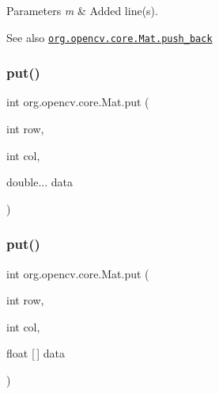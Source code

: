 \begin{DoxyParams}{Parameters}
{\em m} & Added line(s).\\
\hline
\end{DoxyParams}
\begin{DoxySeeAlso}{See also}
\href{http://docs.opencv.org/modules/core/doc/basic_structures.html#mat-push-back}{\tt org.\+opencv.\+core.\+Mat.\+push\+\_\+back} 
\end{DoxySeeAlso}
\mbox{\label{classorg_1_1opencv_1_1core_1_1_mat_a033211373530fc2ac99d291e405fa6f6}} 
\subsubsection{\texorpdfstring{put()}{put()}\hspace{0.1cm}{\footnotesize\ttfamily [1/5]}}
{\footnotesize\ttfamily int org.\+opencv.\+core.\+Mat.\+put (\begin{DoxyParamCaption}\item[{int}]{row,  }\item[{int}]{col,  }\item[{double...}]{data }\end{DoxyParamCaption})}

\mbox{\label{classorg_1_1opencv_1_1core_1_1_mat_a041ac4ce88732c782e2be29306105968}} 
\subsubsection{\texorpdfstring{put()}{put()}\hspace{0.1cm}{\footnotesize\ttfamily [2/5]}}
{\footnotesize\ttfamily int org.\+opencv.\+core.\+Mat.\+put (\begin{DoxyParamCaption}\item[{int}]{row,  }\item[{int}]{col,  }\item[{float \mbox{[}$\,$\mbox{]}}]{data }\end{DoxyParamCaption})}

\mbox{\label{classorg_1_1opencv_1_1core_1_1_mat_a5401cd68e743255a389b32aa94db5d1c}} 
